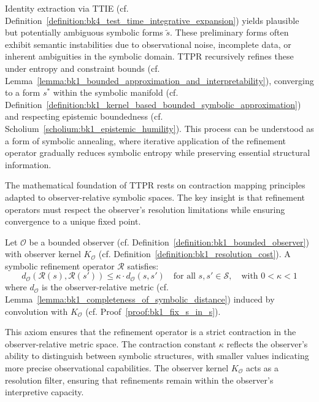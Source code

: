 \begin{remark}
Identity extraction via TTIE (cf. Definition~\ref{definition:bk4_test_time_integrative_expansion}) yields plausible but potentially ambiguous symbolic forms $\tilde{s}$. These preliminary forms often exhibit semantic instabilities due to observational noise, incomplete data, or inherent ambiguities in the symbolic domain. TTPR recursively refines these under entropy and constraint bounds (cf. Lemma~\ref{lemma:bk1_bounded_approximation_and_interpretability}), converging to a form $s^*$ within the symbolic manifold (cf. Definition~\ref{definition:bk1_kernel_based_bounded_symbolic_approximation}) and respecting epistemic boundedness (cf. Scholium~\ref{scholium:bk1_epistemic_humility}). This process can be understood as a form of symbolic annealing, where iterative application of the refinement operator gradually reduces symbolic entropy while preserving essential structural information.
\end{remark}

The mathematical foundation of TTPR rests on contraction mapping principles adapted to observer-relative symbolic spaces. The key insight is that refinement operators must respect the observer's resolution limitations while ensuring convergence to a unique fixed point.

\begin{axiom}
\label{axiom:bk4_refinement_contraction}
Let $\mathcal{O}$ be a bounded observer (cf. Definition~\ref{definition:bk1_bounded_observer}) with observer kernel $K_{\mathcal{O}}$ (cf. Definition~\ref{definition:bk1_resolution_cost}). A symbolic refinement operator $\mathcal{R}$ satisfies:
\[
d_{\mathcal{O}}(\mathcal{R}(s), \mathcal{R}(s')) \le \kappa \cdot d_{\mathcal{O}}(s, s') \quad \text{for all } s, s' \in \mathcal{S}, \quad \text{with } 0 < \kappa < 1
\]
where $d_{\mathcal{O}}$ is the observer-relative metric (cf. Lemma~\ref{lemma:bk1_completeness_of_symbolic_distance}) induced by convolution with $K_{\mathcal{O}}$ (cf. Proof~\ref{proof:bk1_fix_s_in_s}).
\end{axiom}

This axiom ensures that the refinement operator is a strict contraction in the observer-relative metric space. The contraction constant $\kappa$ reflects the observer's ability to distinguish between symbolic structures, with smaller values indicating more precise observational capabilities. The observer kernel $K_{\mathcal{O}}$ acts as a resolution filter, ensuring that refinements remain within the observer's interpretive capacity.

